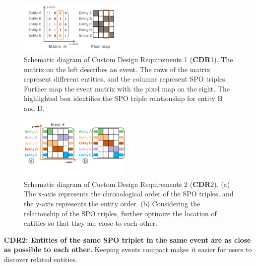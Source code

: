 \documentclass[review,journal]{vgtc}         %
\begin{document}
\begin{figure}[h]
	\centering
	\vspace{-0.5em}
	\includegraphics[width=0.46\textwidth]{Fig/matrix2pixelmap.pdf}
	\vspace{-1em}
	\caption{Schematic diagram of Custom Design Requirements 1 (\textbf{CDR}1). The matrix on the left describes an event. The rows of the matrix represent different entities, and the columns represent SPO triples. Further map the event matrix with the pixel map on the right. The highlighted box identifies the SPO triple relationship for entity B and D.}
	\vspace{-1.5em}
	\label{fig:m2p}
\end{figure}

\begin{figure}[h]
	\centering
	\vspace{-0.5em}
	\includegraphics[width=0.48\textwidth]{Fig/CDR.pdf}
	\vspace{-3.5em}
	\caption{Schematic diagram of Custom Design Requirements 2 (\textbf{CDR}2). (a) The x-axis represents the chronological order of the SPO triples, and the y-axis represents the entity order. (b) Considering the relationship of the SPO triples, further optimize the location of entities so that they are close to each other.}
	\vspace{-0em}
	\label{fig:CDR}
\end{figure}

  \textbf{CDR2: Entities of the same SPO triplet in the same event are as close as possible to each other.} Keeping events compact makes it easier for users to discover related entities.
\end{document}
